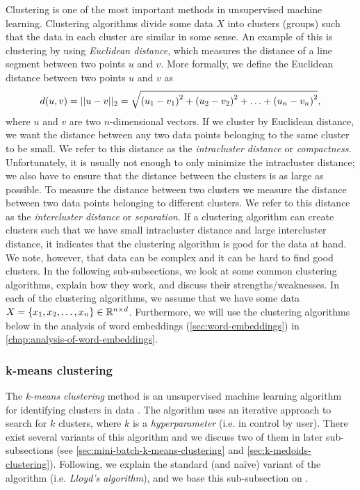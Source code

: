Clustering is one of the most important methods in unsupervised machine learning. Clustering algorithms divide some data $X$ into clusters (groups) such that the data in each cluster are similar in some sense. An example of this is clustering by using \textit{Euclidean distance}, which measures the distance of a line segment between two points $u$ and $v$. More formally, we define the Euclidean distance between two points $u$ and $v$ as
\begin{align}
    d(u, v) = ||u-v||_2 = \sqrt{\left(u_1 - v_1\right)^2 + \left(u_2 - v_2\right)^2 + \ldots + \left(u_n - v_n\right)^2},
    \label{eqn:euclidean-distance}
\end{align}
where $u$ and $v$ are two $n$-dimensional vectors. If we cluster by Euclidean distance, we want the distance between any two data points belonging to the same cluster to be small. We refer to this distance as the \textit{intracluster distance} or \textit{compactness}. Unfortunately, it is usually not enough to only minimize the intracluster distance; we also have to ensure that the distance between the clusters is as large as possible. To measure the distance between two clusters we measure the distance between two data points belonging to different clusters. We refer to this distance as the \textit{intercluster distance} or \textit{separation}. If a clustering algorithm can create clusters such that we have small intracluster distance and large intercluster distance, it indicates that the clustering algorithm is good for the data at hand. We note, however, that data can be complex and it can be hard to find good clusters. In the following sub-subsections, we look at some common clustering algorithms, explain how they work, and discuss their strengths/weaknesses. In each of the clustering algorithms, we assume that we have some data $X = \left\{x_1, x_2, \ldots, x_n\right\} \in \mathbb{R}^{n \times d}$. Furthermore, we will use the clustering algorithms below in the analysis of word embeddings (\cref{sec:word-embeddings}) in \cref{chap:analysis-of-word-embeddings}.

\subsubsection{k-means clustering}
\label{sec:k-means-clustering}
The \textit{k-means clustering} method is an unsupervised machine learning algorithm for identifying clusters in data \cite[Section 9.1]{bishop2006}. The algorithm uses an iterative approach to search for $k$ clusters, where $k$ is a \textit{hyperparameter} (i.e. in control by user). There exist several variants of this algorithm and we discuss two of them in later sub-subsections (see \cref{sec:mini-batch-k-means-clustering} and \cref{sec:k-medoids-clustering}). Following, we explain the standard (and naïve) variant of the algorithm (i.e. \textit{Lloyd's algorithm}), and we base this sub-subsection on \cite[Section 9.1]{bishop2006}.

